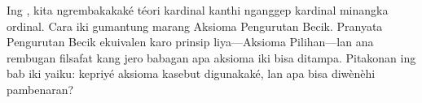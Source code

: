\documentclass[../../../include/open-logic-section]{subfiles}
\begin{document}


Ing , kita
ngrembakakaké téori kardinal kanthi nganggep kardinal minangka ordinal.
Cara iki gumantung marang Aksioma Pengurutan Becik. Pranyata Pengurutan
Becik ekuivalen karo prinsip liya---Aksioma Pilihan---lan ana
rembugan filsafat kang jero babagan apa aksioma iki bisa ditampa.
Pitakonan ing bab iki yaiku: kepriyé aksioma kasebut digunakaké,
lan apa bisa diwènèhi pambenaran?
\end{document}
